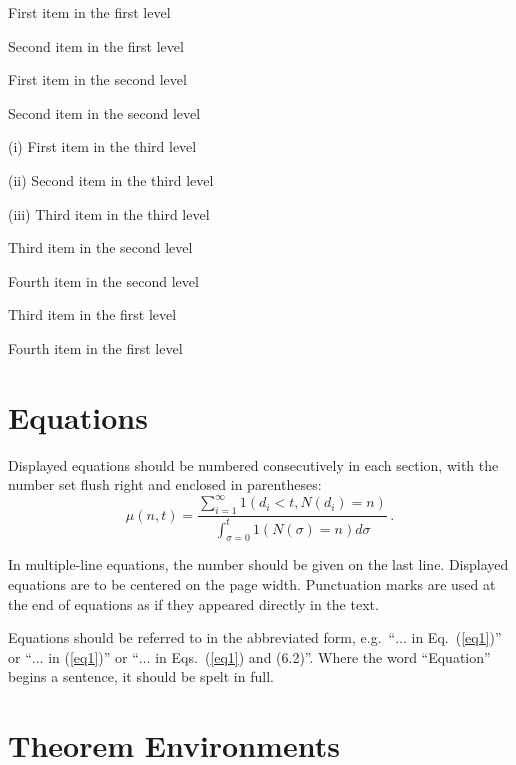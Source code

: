 \documentclass{ws-ijac}
\begin{document}
\begin{arabiclist}
\item First item in the first level
\item Second item in the first level
\begin{alphlist}[(a)]
\item First item in the second level
\item Second item in the second level
  \begin{romanlist}[(iii)]
\item[(i)] First item in the third level
\item[(ii)] Second item in the third level
\item[(iii)] Third item in the third level
\end{romanlist}
\item Third item in the second level
\item Fourth item in the second level
\end{alphlist}
\item Third item in the first level
\item Fourth item in the first level
\end{arabiclist}

\section{Equations}

Displayed equations should be numbered consecutively in each section,
with the number set flush right and enclosed in parentheses:
\begin{equation}
\mu(n, t) = \frac{\sum^\infty_{i=1} 1(d_i < t, N(d_i) = n)}{
\int^t_{\sigma=0} 1(N(\sigma) = n)d\sigma}\, .\label{eq1}
\end{equation}

In multiple-line equations, the number should be given on the last
line. Displayed equations are to be centered on the page width.
Punctuation marks are used at the end of equations as if they
appeared directly in the text.

Equations should be referred to in the abbreviated form,
e.g.~``$\ldots$ in Eq.~(\ref{eq1})'' or
``$\ldots$ in (\ref{eq1})'' or
``$\ldots$ in Eqs.~(\ref{eq1}) and (6.2)''. Where the
word ``Equation'' begins a sentence, it should be spelt in full.

\section{Theorem Environments\label{sfive}}
\end{document}
